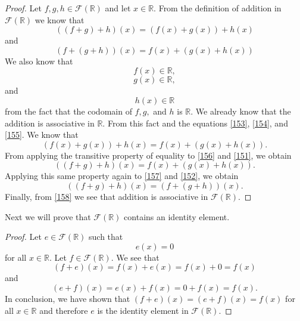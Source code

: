 \documentclass[11pt,a4paper]{article}
\begin{document}
\begin{proof}
Let $f,g,h\in\mathcal{F}(\mathbb{R})$ and let $x\in\mathbb{R}$. From the definition of addition in $\mathcal{F}(\mathbb{R})$ we know that
\begin{equation}\label{151}
((f+g)+h)(x) = (f(x)+g(x))+h(x)
\end{equation}
and
\begin{equation}\label{152}
(f+(g+h))(x) = f(x)+(g(x)+h(x))
\end{equation}
We also know that
\begin{equation}\label{153}
f(x) \in \mathbb{R},
\end{equation}
\begin{equation}\label{154}
g(x) \in \mathbb{R},
\end{equation}
and
\begin{equation}\label{155}
h(x) \in \mathbb{R}
\end{equation}
from the fact that the codomain of $f,g,$ and $h$ is $\mathbb{R}$.
We already know that the addition is associative in $\mathbb{R}$. From this fact and the equations \eqref{153}, \eqref{154}, and \eqref{155}. We know that
\begin{equation}\label{156}
(f(x)+g(x))+h(x) = f(x)+(g(x)+h(x)).
\end{equation}
From applying the transitive property of equality to \eqref{156} and \eqref{151}, we obtain
\begin{equation}\label{157}
((f+g)+h)(x) = f(x)+(g(x)+h(x)).
\end{equation}
Applying this same property again to \eqref{157} and \eqref{152}, we obtain
\begin{equation}\label{158}
((f+g)+h)(x) = (f+(g+h))(x).
\end{equation}
Finally, from \eqref{158} we see that addition is associative in $\mathcal{F}(\mathbb{R})$.
\end{proof}
Next we will prove that $\mathcal{F}(\mathbb{R})$ contains an identity element.
\begin{proof}
Let $e\in\mathcal{F}(\mathbb{R})$ such that 
\begin{equation}
e(x) = 0
\end{equation}
for all $x\in\mathbb{R}$. Let $f\in\mathcal{F}(\mathbb{R})$. We see that
\[(f+e)(x) = f(x)+e(x)=f(x)+0=f(x)\]
and
\[(e+f)(x) = e(x)+f(x)=0+f(x)=f(x).\]
In conclusion, we have shown that $(f+e)(x)=(e+f)(x)=f(x)$ for all $x\in\mathbb{R}$ and therefore $e$ is the identity element in $\mathcal{F}(\mathbb{R})$.
\end{proof}
\end{document}
